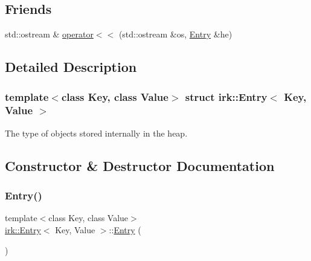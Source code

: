 \subsection*{Friends}
\begin{DoxyCompactItemize}
\item 
std\+::ostream \& \mbox{\hyperlink{structirk_1_1Entry_a885f1645de32df3dbfbf9f2f47f7ea1f}{operator$<$$<$}} (std\+::ostream \&os, \mbox{\hyperlink{structirk_1_1Entry}{Entry}} \&he)
\end{DoxyCompactItemize}


\subsection{Detailed Description}
\subsubsection*{template$<$class Key, class Value$>$\newline
struct irk\+::\+Entry$<$ Key, Value $>$}

The type of objects stored internally in the heap. 

\subsection{Constructor \& Destructor Documentation}
\mbox{\label{structirk_1_1Entry_a648740a9fb42c6dad26fe160991dd940}} 
\subsubsection{\texorpdfstring{Entry()}{Entry()}\hspace{0.1cm}{\footnotesize\ttfamily [1/2]}}
{\footnotesize\ttfamily template$<$class Key, class Value$>$ \\
\mbox{\hyperlink{structirk_1_1Entry}{irk\+::\+Entry}}$<$ Key, Value $>$\+::\mbox{\hyperlink{structirk_1_1Entry}{Entry}} (\begin{DoxyParamCaption}{ }\end{DoxyParamCaption})\hspace{0.3cm}{\ttfamily [default]}}

\mbox{\label{structirk_1_1Entry_a9978964cb5b64644437ab0bde27f0e05}} 
